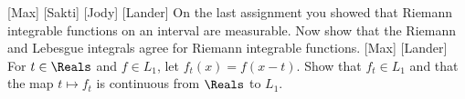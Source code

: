 \documentclass[minion]{homework}
\begin{document}
\begin{aproblems}

 [Max]
 [Sakti]
 [Jody]
 [Lander]
\hproblem [David]
On the last assignment you showed that
Riemann integrable functions on an interval are measurable.  Now show that
the Riemann and Lebesgue integrals agree for Riemann integrable functions.
 [Max]
 [Lander]
\hproblem [Jody]
For $t\in\Reals$ and $f\in L_1$, let $f_t(x)=f(x-t)$.  
Show that $f_t\in L_1$ and that the map $t\mapsto f_t$
is continuous from $\Reals$ to $L_1$.

\end{aproblems}
\end{document}
